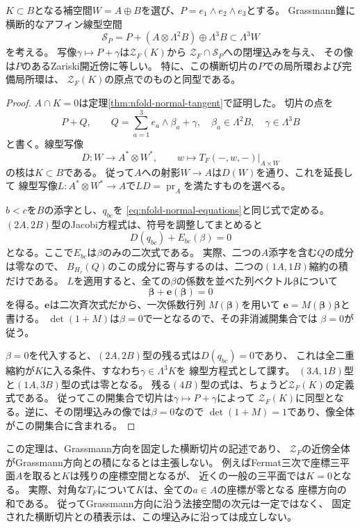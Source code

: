 \begin{theorem}[固定supportにおける横断切片]
\label{thm:nfold-transverse-slice}
$K\subset B$となる補空間$W=A\oplus B$を選び、$P=e_1\wedge e_2\wedge e_3$とする。
Grassmann錐に横断的なアフィン線型空間
\[
 \mathcal S_P=P+(A\otimes\Lambda^2B)\oplus\Lambda^3B
       \subset\Lambda^3W
\]
を考える。
写像$\gamma\mapsto P+\gamma$は$\mathcal Z_F(K)$から
$\mathcal Z_F\cap\mathcal S_P$への閉埋込みを与え、
その像は$P$のあるZariski開近傍に等しい。
特に、この横断切片の$P$での局所環および完備局所環は、
$\mathcal Z_F(K)$の原点でのものと同型である。
\end{theorem}
\begin{proof}
$A\cap K=0$は定理\ref{thm:nfold-normal-tangent}で証明した。
切片の点を
\[
 P+Q,\qquad Q=\sum_{a=1}^3e_a\wedge\beta_a+\gamma,
 \quad\beta_a\in\Lambda^2B,\quad\gamma\in\Lambda^3B
\]
と書く。線型写像
\[
 D:W\longrightarrow A^*\otimes W^*,\qquad
 w\longmapsto T_F(-,w,-)|_{A\times W}
\]
の核は$K\subset B$である。
従って$A$への射影$W\to A$は$D(W)$を通り、これを延長して
線型写像$L:A^*\otimes W^*\to A$で$LD=\operatorname{pr}_A$を満たすものを選べる。

$b<c$を$B$の添字とし、$q_{bc}$を
\eqref{eq:nfold-normal-equations}と同じ式で定める。
$(2A,2B)$型のJacobi方程式は、符号を調整してまとめると
\[
 D(q_{bc})+E_{bc}(\beta)=0
\]
となる。ここで$E_{bc}$は$\beta$のみの二次式である。
実際、二つの$A$添字を含む$Q$の成分は零なので、
$B_{H_r}(Q)$のこの成分に寄与するのは、二つの$(1A,1B)$縮約の積だけである。
$L$を適用すると、全ての$\beta$の係数を並べた列ベクトル$\boldsymbol\beta$について
\[
 \boldsymbol\beta+\boldsymbol e(\boldsymbol\beta)=0
\]
を得る。$\boldsymbol e$は二次斉次式だから、一次係数行列
$M(\boldsymbol\beta)$を用いて
$\boldsymbol e=M(\boldsymbol\beta)\boldsymbol\beta$と書ける。
$\det(1+M)$は$\beta=0$で一となるので、その非消滅開集合では
$\beta=0$が従う。

$\beta=0$を代入すると、$(2A,2B)$型の残る式は$D(q_{bc})=0$であり、
これは全二重縮約が$K$に入る条件、すなわち$\gamma\in\Lambda^3K$を
線型方程式として課す。
$(3A,1B)$型と$(1A,3B)$型の式は零となる。
残る$(4B)$型の式は、ちょうど$\mathcal Z_F(K)$の定義式である。
従ってこの開集合で切片は$\gamma\mapsto P+\gamma$によって
$\mathcal Z_F(K)$に同型となる。逆に、その閉埋込みの像では$\beta=0$なので
$\det(1+M)=1$であり、像全体がこの開集合に含まれる。
\end{proof}

\begin{remark}[横断切片と積分解の区別]
この定理は、Grassmann方向を固定した横断切片の記述であり、
$\mathcal Z_F$の近傍全体がGrassmann方向との積になるとは主張しない。
例えばFermat三次で座標三平面$A$を取ると$K$は残りの座標空間となるが、
近くの一般の三平面では$K=0$となる。
実際、対角な$T_F$について$K$は、全ての$a\in A$の座標が零となる
座標方向の和である。
従ってGrassmann方向に沿う法接空間の次元は一定ではなく、
固定された横断切片との積表示は、この埋込みに沿っては成立しない。
\end{remark}


